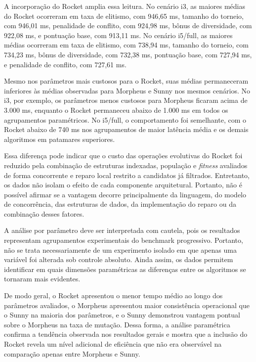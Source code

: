 A incorporação do Rocket amplia essa leitura. No cenário i3, as maiores médias do Rocket ocorreram em taxa de elitismo, com 946,65 ms, tamanho do torneio, com 946,01 ms, penalidade de conflito, com 924,98 ms, bônus de diversidade, com 922,08 ms, e pontuação base, com 913,11 ms. No cenário i5/full, as maiores médias ocorreram em taxa de elitismo, com 738,94 ms, tamanho do torneio, com 734,23 ms, bônus de diversidade, com 732,38 ms, pontuação base, com 727,94 ms, e penalidade de conflito, com 727,61 ms.

Mesmo nos parâmetros mais custosos para o Rocket, suas médias permaneceram inferiores às médias observadas para Morpheus e Sunny nos mesmos cenários. No i3, por exemplo, os parâmetros menos custosos para Morpheus ficaram acima de 3.000 ms, enquanto o Rocket permaneceu abaixo de 1.000 ms em todos os agrupamentos paramétricos. No i5/full, o comportamento foi semelhante, com o Rocket abaixo de 740 ms nos agrupamentos de maior latência média e os demais algoritmos em patamares superiores.

Essa diferença pode indicar que o custo das operações evolutivas do Rocket foi reduzido pela combinação de estruturas indexadas, população e \textit{fitness} avaliados de forma concorrente e reparo local restrito a candidatos já filtrados. Entretanto, os dados não isolam o efeito de cada componente arquitetural. Portanto, não é possível afirmar se a vantagem decorre principalmente da linguagem, do modelo de concorrência, das estruturas de dados, da implementação do reparo ou da combinação desses fatores.

A análise por parâmetro deve ser interpretada com cautela, pois os resultados representam agrupamentos experimentais do benchmark progressivo. Portanto, não se trata necessariamente de um experimento isolado em que apenas uma variável foi alterada sob controle absoluto. Ainda assim, os dados permitem identificar em quais dimensões paramétricas as diferenças entre os algoritmos se tornaram mais evidentes.

De modo geral, o Rocket apresentou o menor tempo médio ao longo dos parâmetros avaliados, o Morpheus apresentou maior consistência operacional que o Sunny na maioria dos parâmetros, e o Sunny demonstrou vantagem pontual sobre o Morpheus na taxa de mutação. Dessa forma, a análise paramétrica confirma a tendência observada nos resultados gerais e mostra que a inclusão do Rocket revela um nível adicional de eficiência que não era observável na comparação apenas entre Morpheus e Sunny.

